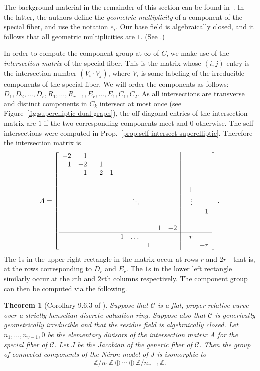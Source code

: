 \documentclass[reqno]{amsart}
\newtheorem{thm}{Theorem}[section]
\theoremstyle{definition}
\theoremstyle{remark}
\def\Z{\mathbb{Z}}
\def\scd{\mathscr{C}}
\begin{document}
The background material in the remainder of this section can be found in~\cite[Ch. 9]{blr}. In the latter, the authors define the \emph{geometric multiplicity} of a component of the special fiber, and use the notation $e_i$. Our base field is algebraically closed, and it follows that all geometric multiplicities are $1$. (See \cite[Defn~9.1.3]{blr}.)

In order to compute the component group at $\infty$ of $C$, we make use of the \emph{intersection matrix} of the special fiber. This is the matrix whose $(i,j)$ entry is the intersection number $(V_i \cdot V_j)$, where $V_i$ is some labeling of the irreducible components of the special fiber. We will order the components as follows: $D_1, D_2, \dots, D_r, R_1, \dots, R_{r-1}, E_r, \dots, E_1, C_1, C_2$. As all intersections are transverse and distinct components in $C_k$ intersect at most once (see Figure~\ref{fig:superelliptic-dual-graph}), the off-diagonal entries of the intersection matrix are $1$ if the two corresponding components meet and $0$ otherwise. The self-intersections were computed in Prop.~\ref{prop:self-intersect-superelliptic}. Therefore the intersection matrix is
\[
A = \left[\begin{array}{rrrrrrrrr|rr}
  -2 & 1 & & & & & & & & & \\
  1 & -2 & 1 & & & & & & & & \\
  & 1 & -2 & 1 & & & & & & & \\
  & & & & & & & & & & \\
  & & & & & & & & & 1 & \\
  & & & & & \ddots & & & & \vdots & \\
  & & & & & & & & & & 1 \\
  & & & & & & & & & & \\
  & & & & & & & 1 & -2 & & \\ \hline
  & & & & 1 & \dots & & & & -r & \\
  & & & & & & 1 & & & & -r
\end{array}\right].
\]
The $1$s in the upper right rectangle in the matrix occur at rows $r$ and $2r$---that is, at the rows corresponding to $D_r$ and $E_r$. The $1$s in the lower left rectangle similarly occur at the $r$th and $2r$th columns respectively. The component group can then be computed via the following.
\begin{thm}[Corollary 9.6.3 of \cite{blr}]\label{thm:elementary-divisors-comp-group}
  Suppose that $\scd$ is a flat, proper relative curve over a strictly henselian discrete valuation ring. Suppose also that $\scd$ is generically geometrically irreducible and that the residue field is algebraically closed. Let $n_1, \dots, n_{v-1}, 0$ be the elementary divisors of the intersection matrix $A$ for the special fiber of $\scd$. Let $J$ be the Jacobian of the generic fiber of $\scd$. Then the group of connected components of the N\'eron model of $J$ is isomorphic to
  \[
  {\Z}/{n_1\Z} \oplus \cdots \oplus {\Z}/{n_{v-1}\Z}.
  \]
\end{thm}
\end{document}
